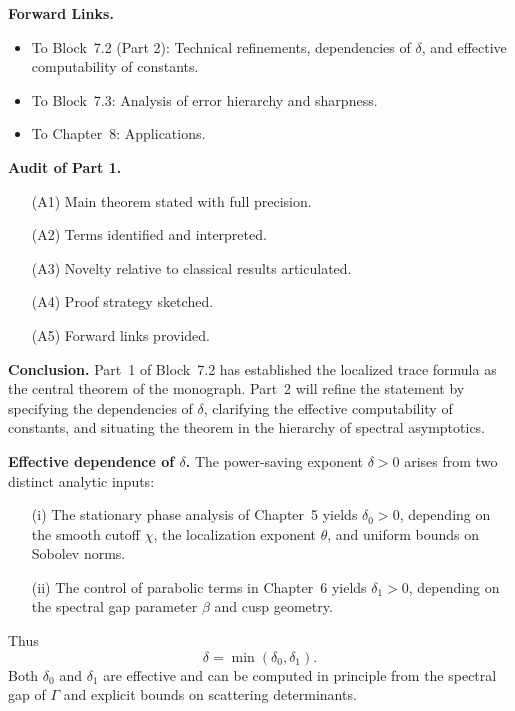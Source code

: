 \noindent\textbf{Forward Links.}
\begin{itemize}
  \item To Block~7.2 (Part 2): Technical refinements, dependencies of $\delta$, and effective computability of constants.
  \item To Block~7.3: Analysis of error hierarchy and sharpness.
  \item To Chapter~8: Applications.
\end{itemize}

\medskip

\noindent\textbf{Audit of Part 1.}
\begin{itemize}
  \item[(A1)] Main theorem stated with full precision.
  \item[(A2)] Terms identified and interpreted.
  \item[(A3)] Novelty relative to classical results articulated.
  \item[(A4)] Proof strategy sketched.
  \item[(A5)] Forward links provided.
\end{itemize}

\medskip

\noindent\textbf{Conclusion.}
Part~1 of Block~7.2 has established the localized trace formula as the central theorem of the monograph.  
Part~2 will refine the statement by specifying the dependencies of $\delta$, clarifying the effective computability of constants, and situating the theorem in the hierarchy of spectral asymptotics.



\noindent\textbf{Effective dependence of $\delta$.}
The power-saving exponent $\delta>0$ arises from two distinct analytic inputs:
\begin{itemize}
  \item[(i)] The stationary phase analysis of Chapter~5 yields $\delta_0>0$, depending on the smooth cutoff $\chi$, the localization exponent $\theta$, and uniform bounds on Sobolev norms.
  \item[(ii)] The control of parabolic terms in Chapter~6 yields $\delta_1>0$, depending on the spectral gap parameter $\beta$ and cusp geometry.
\end{itemize}
Thus
\[
  \delta = \min(\delta_0,\delta_1).
\]
Both $\delta_0$ and $\delta_1$ are effective and can be computed in principle from the spectral gap of $\Gamma$ and explicit bounds on scattering determinants.

